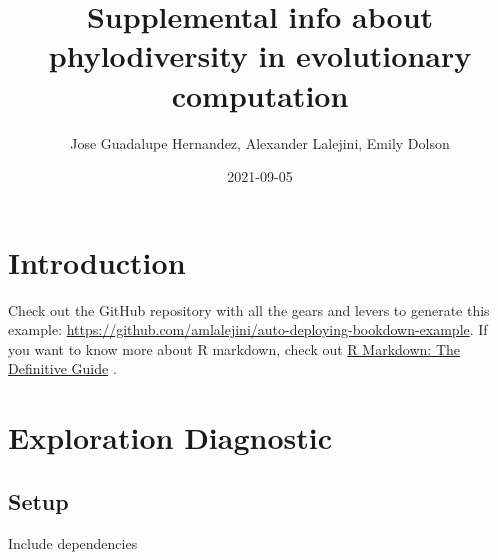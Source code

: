 \documentclass[]{book}
\title{Supplemental info about phylodiversity in evolutionary computation}
\author{Jose Guadalupe Hernandez, Alexander Lalejini, Emily Dolson}
\date{2021-09-05}
\begin{document}
\maketitle

{
\setcounter{tocdepth}{1}
\tableofcontents
}
\hypertarget{introduction}{%
\chapter{Introduction}\label{introduction}}

Check out the GitHub repository with all the gears and levers to generate this example: \url{https://github.com/amlalejini/auto-deploying-bookdown-example}.
If you want to know more about R markdown, check out \href{https://bookdown.org/yihui/rmarkdown/}{R Markdown: The Definitive Guide} \citep{xie_r_2019}.

\hypertarget{exploration-diagnostic}{%
\chapter{Exploration Diagnostic}\label{exploration-diagnostic}}

\hypertarget{setup}{%
\section{Setup}\label{setup}}

Include dependencies
\end{document}
